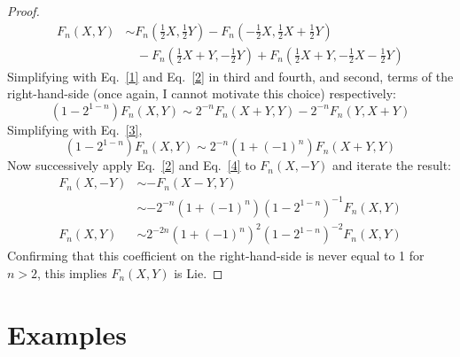 \documentclass{article}
\begin{document}
\begin{proof}
\begin{align*}
    {F_n}(X,Y) &\sim {F_n}(\frac{1}{2}X,\frac{1}{2}Y) - {F_n}( - \frac{1}{2}X,\frac{1}{2}X + \frac{1}{2}Y)\\ 
    &\ \ \ \ - {F_n}(\frac{1}{2}X + Y, - \frac{1}{2}Y) + {F_n}(\frac{1}{2}X + Y, - \frac{1}{2}X - \frac{1}{2}Y)
\end{align*}
Simplifying with Eq.~\eqref{1} and Eq.~\eqref{2} in third and fourth, and second, terms of the right-hand-side (once again, I cannot motivate this choice) respectively:
$$(1-2^{1-n})F_n(X,Y)\sim 2^{-n}F_n(X+Y,Y)-2^{-n}F_n(Y,X+Y)$$
Simplifying with Eq.~\eqref{3},
\begin{equation}\label{4}
    (1-2^{1-n})F_n(X,Y)\sim 2^{-n}(1+(-1)^n)F_n(X+Y,Y)
\end{equation}
Now successively apply Eq.~\eqref{2} and Eq.~\eqref{4} to $F_n(X,-Y)$ and iterate the result:
\begin{align*}
    F_n(X,-Y)&\sim -F_n(X-Y,Y)\\
      &\sim -2^{-n}(1+(-1)^n)(1-2^{1-n})^{-1}F_n(X,Y)\\
    F_n(X,Y)&\sim 2^{-2n}(1+(-1)^n)^2(1-2^{1-n})^{-2}F_n(X,Y)
\end{align*}
Confirming that this coefficient on the right-hand-side is never equal to 1 for $n>2$, this implies $F_n(X,Y)$ is Lie.
\end{proof}

\section{Examples}
\end{document}
